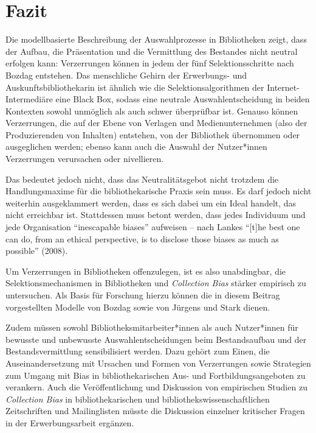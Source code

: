 \documentclass[a4paper,
fontsize=11pt,
oneside,
numbers=noperiodatend,
parskip=half-,
bibliography=totoc,
final
]{scrartcl}
\begin{document}
\hypertarget{fazit}{%
\section{Fazit}\label{fazit}}

Die modellbasierte Beschreibung der Auswahlprozesse in Bibliotheken
zeigt, dass der Aufbau, die Präsentation und die Vermittlung des
Bestandes nicht neutral erfolgen kann: Verzerrungen können in jedem der
fünf Selektionsschritte nach Bozdag entstehen. Das menschliche Gehirn
der Erwerbungs- und Auskunftsbibliothekarin ist ähnlich wie die
Selektionsalgorithmen der Internet-Intermediäre eine Black Box, sodass
eine neutrale Auswahlentscheidung in beiden Kontexten sowohl unmöglich
als auch schwer überprüfbar ist. Genauso können Verzerrungen, die auf
der Ebene von Verlagen und Medienunternehmen (also der Produzierenden
von Inhalten) entstehen, von der Bibliothek übernommen oder ausgeglichen
werden; ebenso kann auch die Auswahl der Nutzer*innen Verzerrungen
verursachen oder nivellieren.

Das bedeutet jedoch nicht, dass das Neutralitätsgebot nicht trotzdem die
Handlungsmaxime für die bibliothekarische Praxis sein muss. Es darf
jedoch nicht weiterhin ausgeklammert werden, dass es sich dabei um ein
Ideal handelt, das nicht erreichbar ist. Stattdessen muss betont werden,
dass jedes Individuum und jede Organisation \enquote{inescapable biases}
aufweisen -- nach Lankes \enquote{{[}t{]}he best one can do, from an
ethical perspective, is to disclose those biases as much as possible}
(2008).

Um Verzerrungen in Bibliotheken offenzulegen, ist es also unabdingbar,
die Selektionsmechanismen in Bibliotheken und \emph{Collection Bias}
stärker empirisch zu untersuchen. Als Basis für Forschung hierzu können
die in diesem Beitrag vorgestellten Modelle von Bozdag sowie von Jürgens
und Stark dienen.

Zudem müssen sowohl Bibliotheksmitarbeiter*innen als auch Nutzer*innen
für bewusste und unbewusste Auswahlentscheidungen beim Bestandsaufbau
und der Bestandsvermittlung sensibilisiert werden. Dazu gehört zum
Einen, die Auseinandersetzung mit Ursachen und Formen von Verzerrungen
sowie Strategien zum Umgang mit Bias in bibliothekarischen Aus- und
Fortbildungsangeboten zu verankern. Auch die Veröffentlichung und
Diskussion von empirischen Studien zu \emph{Collection Bias} in
bibliothekarischen und bibliothekswissenschaftlichen Zeitschriften und
Mailinglisten müsste die Diskussion einzelner kritischer Fragen in der
Erwerbungsarbeit ergänzen.
\end{document}
